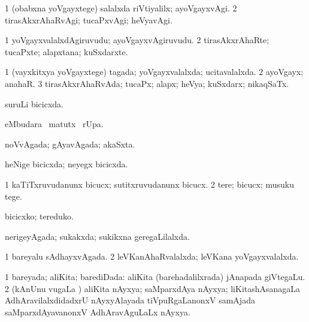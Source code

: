 \bentry
{} 
\gl{\kirxvi}
\expl{}
\bmng
\bnum
\num{1} (obabxna yoVgayxtege) salalxda riVtiyalilx; ayoVgayxvAgi. 
\num{2} tirasAkxrAhaRvAgi; tucaPxvAgi; heVyavAgi. 
\enum
\emng
\eentry

\bentry
{} 
\gl{\nA}
\expl{}
\bmng
\bnum
\num{1} yoVgayxvalalxdAgiruvudu; ayoVgayxvAgiruvudu. 
\num{2} tirasAkxrAhaRte; tucaPxte; alapxtana; kuSxdarxte. 
\enum
\emng
\eentry

\bentry
{} 
\gl{\gu}
\bmng
\bnum
\num{1} (vayxkitxya yoVgayxtege) tagada; yoVgayxvalalxda; ucitavalalxda. 
\num{2} ayoVgayx; anahaR. 
\num{3} tirasAkxrAhaRvAda; tucaPx; alapx; heVya; kuSxdarx; nikaqSaTx. 
\enum
\emng
\eentry

\bentry
{} 
\gl{\gu}
\expl{}
\bmng
suruLi bicicxda. 
\emng
\eentry

\bentry
{} 
\gl{\kirx}
\expl{}
\bmng
{} eMbudara \BU\ matutx \BUkaq\ rUpa. 
\emng
\eentry

\bentry
{} 
\gl{\gu}
\expl{}
\bmng
noVvAgada; gAyavAgada; akaSxta. 
\emng
\eentry

\bentry
{} 
\gl{\gu}
\expl{}
\bmng
heNige bicicxda; neyegx bicicxda. 
\emng
\eentry

\bentry
{} 
\gl{\kirx}


\noindent
\gl{\sakirx}
\expl{}
\bmng
\bnum
\num{1} kaTiTxruvudanunx bicucx; sutitxruvudanunx bicucx. 
\num{2} tere; bicucx; musuku tege. 
\enum
\emng

\noindent
\gl{\akirx}
\expl{}
\bmng
bicicxko; tereduko. 
\emng
\eentry

\bentry
{} 
\gl{\gu}
\expl{}
\bmng
nerigeyAgada; sukakxda; sukikxna geregaLilalxda. 
\emng
\eentry

\bentry
{} 
\gl{\gu}
\expl{}
\bmng
\bnum
\num{1} bareyalu sAdhayxvAgada. 
\num{2} leVKanAhaRvalalxda; leVKana yoVgayxvalalxda. 
\enum
\emng
\eentry

\bentry
{} 
\gl{\gu}
\expl{}
\bmng
\bnum
\num{1} bareyada; aliKita; barediDada:  aliKita (barehadalilxrada) jAnapada giVtegaLu. 
\num{2} (kAnUnu \mo vugaLa \vi) aliKita nAyxya; saMparxdAya nAyxya; liKitashAsanagaLa AdhAravilalxdidadxrU nAyxyAlayada tiVpuRgaLanonxV samAjada saMparxdAyavanonxV AdhAravAguLaLx nAyxya. 
\enum
\emng
\eentry

